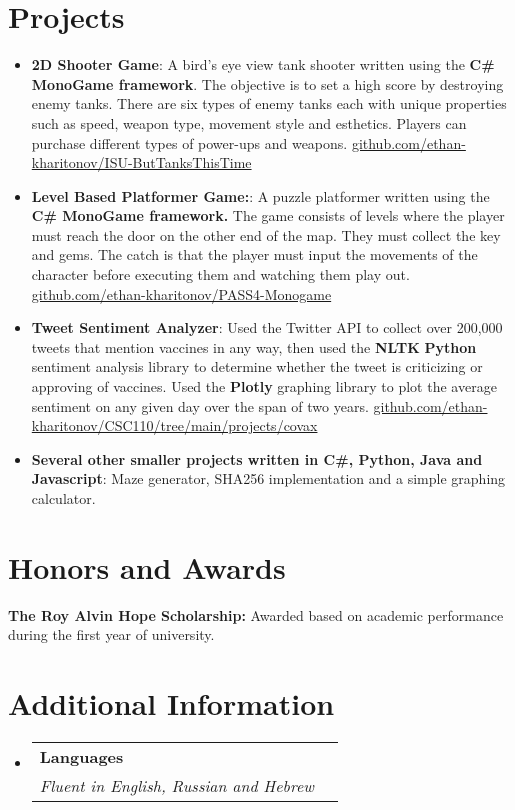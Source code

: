 \documentclass[a4paper,20pt]{article}
\makeatletter
\newcommand{\resumeItem}[2]{
	\item\small{
		\textbf{#1}{: #2 \vspace{-2pt}}
	}
}
\newcommand{\resumeSubheading}[4]{
	\vspace{-1pt}\item
	\begin{tabular*}{0.97\textwidth}{l@{\extracolsep{\fill}}r}
		\textbf{#1} & #2 \\
		\textit{#3} & \textit{#4} \\
	\end{tabular*}\vspace{-5pt}
}
\newcommand{\resumeSubItem}[2]{\resumeItem{#1}{#2}\vspace{-3pt}}
\newcommand{\resumeSubHeadingListStart}{\begin{itemize}[leftmargin=*]}
\newcommand{\resumeSubHeadingListEnd}{\end{itemize}}
\makeatother
\begin{document}
	
	\vspace{-5pt}
	\section{Projects}
	\resumeSubHeadingListStart
	\resumeSubItem{2D Shooter Game}{A bird's eye view tank shooter written using the \textbf{C\# MonoGame framework}. The objective is to set a high score by destroying enemy tanks. There are six types of enemy tanks each with unique properties such as speed, weapon type, movement style and esthetics. Players can purchase different types of power-ups and weapons. \href{https://github.com/ethan-kharitonov/ISU-ButTanksThisTime}{github.com/ethan-kharitonov/ISU-ButTanksThisTime}}
	\vspace{2pt}
	\resumeSubItem{Level Based Platformer Game:}{A puzzle platformer written using the \textbf{C\# MonoGame framework.} The game consists of levels where the player must reach the door on the other end of the map. They must collect the key and gems. The catch is that the player must input the movements of the character before executing them and watching them play out. \href{https://github.com/ethan-kharitonov/PASS4-Monogame}{github.com/ethan-kharitonov/PASS4-Monogame}}
	\resumeSubItem{Tweet Sentiment Analyzer}{Used the Twitter API to collect over 200,000 tweets that mention vaccines in any way, then used the \textbf{NLTK} \textbf{Python} sentiment analysis library to determine whether the tweet is criticizing or approving of vaccines. Used the \textbf{Plotly} graphing library to plot the average sentiment on any given day over the span of two years.
	\href{https://github.com/ethan-kharitonov/CSC110/tree/main/projects/covax}{github.com/ethan-kharitonov/CSC110/tree/main/projects/covax}}
	\vspace{2pt}
	\resumeSubItem{Several other smaller projects written in C\#, Python, Java and Javascript}{Maze generator, SHA256 implementation and a simple graphing calculator.}
	\vspace{2pt}
	\resumeSubHeadingListEnd
	\vspace{-5pt}

	\section{Honors and Awards}
	\begin{description}[font=$\bullet$]
		\item {\textbf{The Roy Alvin Hope Scholarship:} Awarded based on academic performance during the first year of university.}
	\end{description}
	
	\vspace{-5pt}
	\section{Additional Information}
	\resumeSubHeadingListStart
	\resumeSubheading
	{Languages}{}
	{Fluent in English, Russian and Hebrew}{}
	\vspace{5pt}
	\resumeSubHeadingListEnd
	
\end{document}
